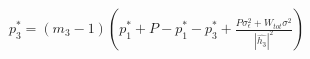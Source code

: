\documentclass[preview]{standalone}
\begin{document}
\begin{align*}
p_3^\ast = \left(m_3 - 1\right) \left( p_1^\ast + P - p_1^\ast - p_3^\ast + \frac{P \sigma_\epsilon^2 + W_{tot} \sigma^2}{\left|\hat{h_3}\right|^2}\right)
\end{align*}
\end{document}
